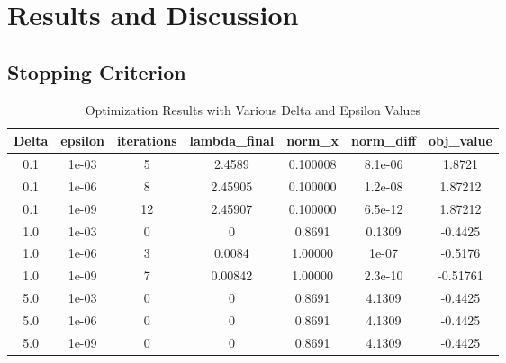 \documentclass[12pt]{article}
\begin{document}
\section{Results and Discussion}

\subsection{Stopping Criterion}
\begin{table}[h!]
\centering
\begin{tabular}{ccccccc}
\hline
\textbf{Delta} & \textbf{epsilon} & \textbf{iterations} & \textbf{lambda\_final} & \textbf{norm\_x} & \textbf{norm\_diff} & \textbf{obj\_value} \\
\hline
0.1 & 1e-03 & 5  & 2.4589  & 0.100008 & 8.1e-06  & 1.8721   \\
0.1 & 1e-06 & 8  & 2.45905 & 0.100000 & 1.2e-08  & 1.87212  \\
0.1 & 1e-09 & 12 & 2.45907 & 0.100000 & 6.5e-12  & 1.87212  \\
1.0 & 1e-03 & 0  & 0       & 0.8691   & 0.1309   & -0.4425  \\
1.0 & 1e-06 & 3  & 0.0084  & 1.00000  & 1e-07    & -0.5176  \\
1.0 & 1e-09 & 7  & 0.00842 & 1.00000  & 2.3e-10  & -0.51761 \\
5.0 & 1e-03 & 0  & 0       & 0.8691   & 4.1309   & -0.4425  \\
5.0 & 1e-06 & 0  & 0       & 0.8691   & 4.1309   & -0.4425  \\
5.0 & 1e-09 & 0  & 0       & 0.8691   & 4.1309   & -0.4425  \\
\hline
\end{tabular}
\caption{Optimization Results with Various Delta and Epsilon Values}
\end{table}
\end{document}
